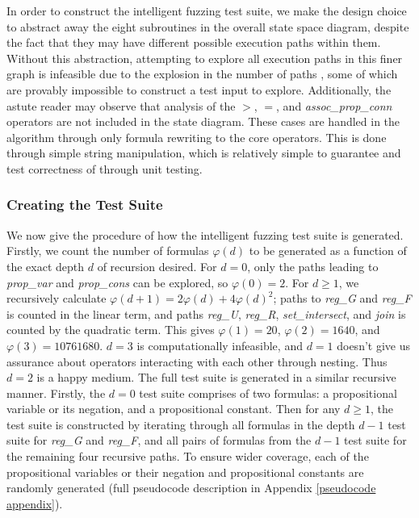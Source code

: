 \documentclass[runningheads]{llncs}
\renewcommand{\phi}{\varphi}
\begin{document}
In order to construct the intelligent fuzzing test suite, we make the design choice to abstract away the eight subroutines in the overall state space diagram, despite the fact that they may have different possible execution paths within them. Without this abstraction, attempting to explore all execution paths in this finer graph is infeasible due to the explosion in the number of paths \cite{Pham_2016}, some of which are provably impossible to construct a test input to explore.
Additionally, the astute reader may observe that analysis of the $>$, $=$, and \textit{assoc\_prop\_conn} operators are not included in the state diagram. 
These cases are handled in the algorithm through only formula rewriting to the core operators. This is done through simple string manipulation, which is relatively simple to guarantee and test correctness of through unit testing.
\subsubsection{Creating the Test Suite}
 We now give the procedure of how the intelligent fuzzing test suite is generated. 
Firstly, we count the number of formulas $\phi(d)$ to be generated as a function of the exact depth $d$ of recursion desired. 
For $d = 0$, only the paths leading to \textit{prop\_var} and \textit{prop\_cons} can be explored, so $\phi(0) = 2$. For $d \geq 1$, we recursively calculate $\phi(d + 1) = 2\phi(d) + 4\phi(d)^2$; paths to \textit{reg\_G} and \textit{reg\_F} is counted in the linear term, and paths \textit{reg\_U}, \textit{reg\_R}, \textit{set\_intersect}, and \textit{join} is counted by the quadratic term. 
This gives $\phi(1) = 20$, $\phi(2) = 1640$, and $\phi(3) = 10761680$. 
$d = 3$ is computationally infeasible, and $d = 1$ doesn't give us assurance about operators interacting with each other through nesting. Thus $d = 2$ is a happy medium. 
The full test suite is generated in a similar recursive manner. 
Firstly, the $d = 0$ test suite comprises of two formulas: a propositional variable or its negation, and a propositional constant. 
Then for any $d \geq 1$, the test suite is constructed by iterating through all formulas in the depth $d-1$ test suite for \textit{reg\_G} and \textit{reg\_F}, and all pairs of formulas from the $d-1$ test suite for the remaining four recursive paths. 
To ensure wider coverage, each of the propositional variables or their negation and propositional constants are randomly generated (full pseudocode description in Appendix \ref{pseudocode appendix}).
\end{document}
